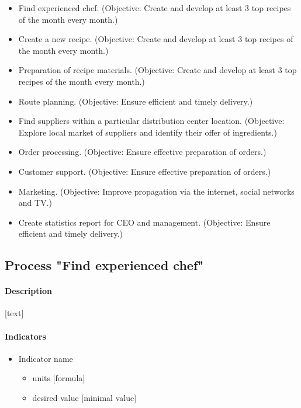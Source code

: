 \documentclass[11pt,a4paper]{article}
\begin{document}
\begin{itemize}
    \item Find experienced chef. (Objective: Create and develop at least 3 top recipes of the month every month.)
    \item Create a new recipe. (Objective: Create and develop at least 3 top recipes of the month every month.)
    \item Preparation of recipe materials. (Objective: Create and develop at least 3 top recipes of the month every month.)
    \item Route planning. (Objective: Ensure efficient and timely delivery.)
    \item Find suppliers within a particular distribution center location. (Objective: Explore local market of suppliers and identify their offer of ingredients.)
    \item Order processing. (Objective: Ensure effective preparation of orders.)
    \item Customer support. (Objective: Ensure effective preparation of orders.)
    \item Marketing. (Objective: Improve propagation via the internet, social networks and TV.)
    \item Create statistics report for CEO and management. (Objective: Ensure efficient and timely delivery.)
\end{itemize}

\subsection{Process "Find experienced chef"}

\paragraph{Description}

[text]

\paragraph{Indicators}

\begin{itemize}
    \item Indicator name
    \begin{itemize}
        \item units [formula]
        \item desired value [minimal value]
    \end{itemize}
\end{itemize}
\end{document}
